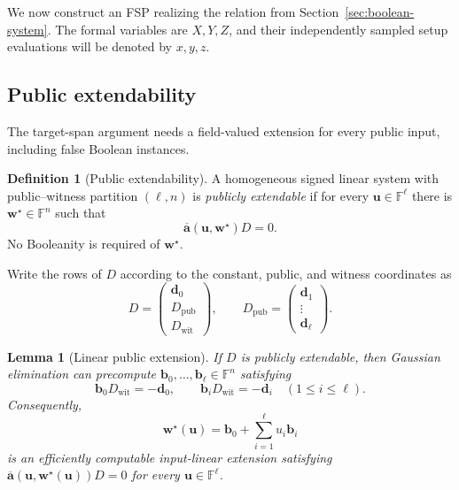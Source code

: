 \documentclass[11pt]{article}
\newtheorem{lemma}[theorem]{Lemma}
\theoremstyle{definition}
\newtheorem{definition}[theorem]{Definition}
\newcommand{\F}{\mathbb F}
\begin{document}
We now construct an FSP realizing the relation from
Section~\ref{sec:boolean-system}.  The formal
variables are $X,Y,Z$, and their independently sampled setup evaluations will
be denoted by $x,y,z$.

\subsection{Public extendability}

The target-span argument needs a field-valued extension for every public
input, including false Boolean instances.

\begin{definition}[Public extendability]
\label{def:public-extendability}
A homogeneous signed linear system with public--witness partition $(\ell,n)$
is \emph{publicly extendable} if for every $\mathbf u\in\F^\ell$ there is
$\mathbf w^\star\in\F^n$ such that
\[
  \overline{\mathbf a}(\mathbf u,\mathbf w^\star)D=0.
\]
No Booleanity is required of $\mathbf w^\star$.
\end{definition}



Write the rows of $D$ according to the constant, public, and witness
coordinates as
\[
  D=
  \begin{pmatrix}
    \mathbf d_0\\ D_{\mathrm{pub}}\\ D_{\mathrm{wit}}
  \end{pmatrix},
  \qquad
  D_{\mathrm{pub}}=
  \begin{pmatrix}\mathbf d_1\\ \vdots\\ \mathbf d_\ell\end{pmatrix}.
\]

\begin{lemma}[Linear public extension]
\label{lem:linear-public-extension}
If $D$ is publicly extendable, then Gaussian elimination can precompute
$\mathbf b_0,\ldots,\mathbf b_\ell\in\F^n$ satisfying
\[
  \mathbf b_0D_{\mathrm{wit}}=-\mathbf d_0,
  \qquad
  \mathbf b_iD_{\mathrm{wit}}=-\mathbf d_i
  \quad(1\le i\le\ell).
\]
Consequently,
\begin{equation}
  \mathbf w^\star(\mathbf u)
  =\mathbf b_0+\sum_{i=1}^{\ell}u_i\mathbf b_i
  \label{eq:linear-public-extension}
\end{equation}
is an efficiently computable input-linear extension satisfying
$\overline{\mathbf a}(\mathbf u,\mathbf w^\star(\mathbf u))D=0$ for every
$\mathbf u\in\F^\ell$.
\end{lemma}
\end{document}
